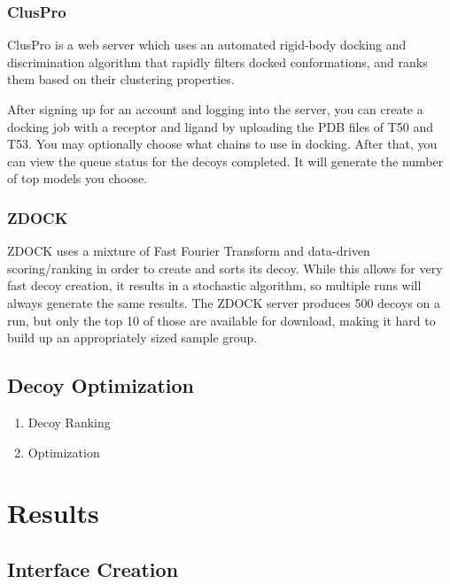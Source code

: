 \documentclass{article}
\begin{document}
\subsubsection{ClusPro}

ClusPro is a web server which uses an automated rigid-body docking and discrimination algorithm that rapidly filters docked conformations, and ranks them based on their clustering properties. 

After signing up for an account and logging into the server, you can create a docking job with a receptor and ligand by uploading the PDB files of T50 and T53. You may optionally choose what chains to use in docking. After that, you can view the queue status for the decoys completed. It will generate the number of top models you choose.

\subsubsection{ZDOCK}

ZDOCK uses a mixture of Fast Fourier Transform and data-driven scoring/ranking in order to create and sorts its decoy. While this allows for very fast decoy creation, it results in a stochastic algorithm, so multiple runs will always generate the same results. The ZDOCK server produces 500 decoys on a run, but only the top 10 of those are available for download, making it hard to build up an appropriately sized sample group.

\subsection{Decoy Optimization}

\begin{enumerate}

\item Decoy Ranking

\item Optimization

\end{enumerate}



\section{Results}



\subsection{Interface Creation}
\end{document}
